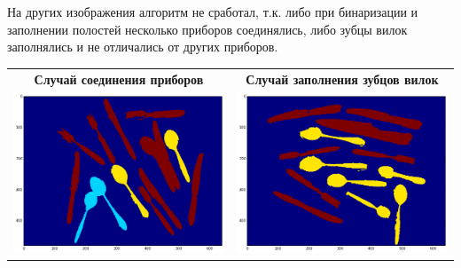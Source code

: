 \documentclass[12pt, a4paper]{article}
\begin{document}
        На других изображения алгоритм не сработал, т.к. либо при бинаризации и заполнении полостей несколько приборов соединялись, либо зубцы вилок заполнялись и не отличались от других приборов.

        \begin{center}
        \begin{tabular}{c c}
            {\bf Случай соединения приборов} & {\bf Случай заполнения зубцов вилок} \\
            \includegraphics[width=8cm]{err1.png} & \includegraphics[width=8cm]{err2.png} \\
        \end{tabular}
        \end{center}

        
\end{document}
